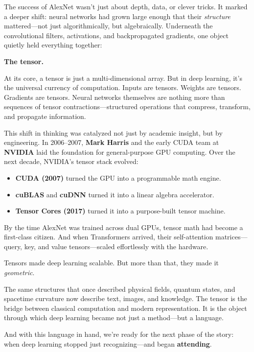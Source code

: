 The success of AlexNet wasn’t just about depth, data, or clever tricks. It marked a deeper shift: neural networks had grown large enough that their \emph{structure} mattered—not just algorithmically, but algebraically. Underneath the convolutional filters, activations, and backpropagated gradients, one object quietly held everything together:

\begin{center}
\textbf{The tensor.}
\end{center}

At its core, a tensor is just a multi-dimensional array. But in deep learning, it’s the universal currency of computation. Inputs are tensors. Weights are tensors. Gradients are tensors. Neural networks themselves are nothing more than sequences of tensor contractions—structured operations that compress, transform, and propagate information.

This shift in thinking was catalyzed not just by academic insight, but by engineering. In 2006–2007, \textbf{Mark Harris} and the early CUDA team at \textbf{NVIDIA} laid the foundation for general-purpose GPU computing. Over the next decade, NVIDIA’s tensor stack evolved:

\begin{itemize}
  \item \textbf{CUDA (2007)} turned the GPU into a programmable math engine.
  \item \textbf{cuBLAS} and \textbf{cuDNN} turned it into a linear algebra accelerator.
  \item \textbf{Tensor Cores (2017)} turned it into a purpose-built tensor machine.
\end{itemize}

By the time AlexNet was trained across dual GPUs, tensor math had become a first-class citizen. And when Transformers arrived, their self-attention matrices—query, key, and value tensors—scaled effortlessly with the hardware.

Tensors made deep learning scalable.  
But more than that, they made it \emph{geometric}.

The same structures that once described physical fields, quantum states, and spacetime curvature now describe text, images, and knowledge. The tensor is the bridge between classical computation and modern representation. It is the object through which deep learning became not just a method—but a language.

And with this language in hand, we’re ready for the next phase of the story: when deep learning stopped just recognizing—and began \textbf{attending}.



